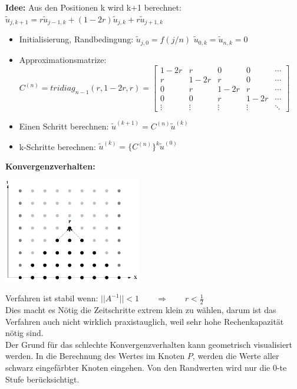 \textbf{Idee:} Aus den Positionen k wird k+1 berechnet: $\tilde{u}_{j,k+1} = r \tilde{u}_{j-1,k} + (1-2r)\tilde{u}_{j,k} + r \tilde{u}_{j+1,k}$\\


\begin{itemize}
\item Initialisierung, Randbedingung: $\tilde{u}_{j,0}=f(j/n)$ \qquad $\tilde{u}_{0,k}=\tilde{u}_{n,k}=0$
\item Approximationsmatrize: $C^{(n)}=tridiag_{n-1}(r,1-2r,r)=\begin{bmatrix}
1-2r& r		& 0		& 0 	&\cdots\\
r	& 1-2r  & r		& 0		&\cdots\\
0	& r		& 1-2r 	& r 	&\cdots\\
0	& 0		& r		& 1-2r 	&\cdots\\
\vdots&	\vdots&\vdots&\vdots&\ddots	
\end{bmatrix}$ 
\item Einen Schritt berechnen: $\tilde{u}^{(k+1)}=C^{(n)} \tilde{u}^{(k)}$
\item k-Schritte berechnen: $\tilde{u}^{(k)}=\big\{C^{(n)}\big\}^k \tilde{u}^{(0)}$
\end{itemize}

\textbf{Konvergenzverhalten:} \\

\begin{minipage}{6cm}
\includegraphics[width=6cm]{Content/Numerik/KonvExplizit.png}
\end{minipage}
\hfill
\begin{minipage}{12cm}
Verfahren ist stabil wenn: $||A^{-1}|| < 1 \qquad \Rightarrow\qquad r < \frac{1}{2}$\\

Dies macht es Nötig die Zeitschritte extrem klein zu wählen, darum ist das Verfahren auch nicht wirklich praxistauglich, weil sehr hohe Rechenkapazität nötig sind.\\

Der Grund für das schlechte Konvergenzverhalten kann geometrisch visualisiert werden. In die Berechnung des Wertes im Knoten $P$, werden die Werte aller schwarz eingefärbter Knoten eingehen. Von den Randwerten wird nur die 0-te Stufe berücksichtigt.
\end{minipage}






